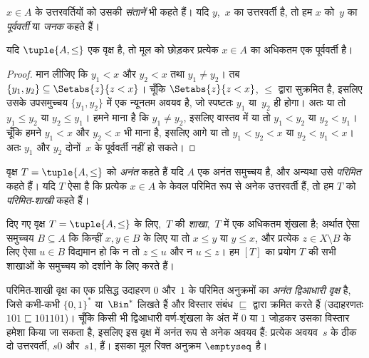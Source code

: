 \documentclass[../../../include/open-logic-section]{subfiles}
\begin{document}
$x \in A$ के उत्तरवर्तियों को उसकी \emph{संतानें} भी कहते हैं। यदि
$y$,~$x$ का उत्तरवर्ती है, तो हम $x$ को~$y$ का \emph{पूर्ववर्ती} या
\emph{जनक} कहते हैं।

\begin{prop}
यदि $\tuple{A,\le}$ एक वृक्ष है, तो मूल को छोड़कर प्रत्येक $x \in A$ का
अधिकतम एक पूर्ववर्ती है।
\end{prop}

\begin{proof}
  मान लीजिए कि $y_1 < x$ और $y_2 < x$ तथा $y_1 \neq y_2$। तब $\{y_1,
  y_2\} \subseteq \Setabs{z}{z<x}$। चूँकि $\Setabs{z}{z<x}$,
  $\le$ द्वारा सुक्रमित है, इसलिए उसके उपसमुच्चय $\{y_1, y_2\}$ में एक
  न्यूनतम अवयव है, जो स्पष्टतः $y_1$ या~$y_2$ ही होगा। अतः या तो
  $y_1 \le y_2$ या $y_2 \le y_1$। हमने माना है कि $y_1 \neq y_2$, इसलिए
  वास्तव में या तो $y_1 < y_2$ या $y_2 < y_1$। चूँकि हमने $y_1 < x$ और
  $y_2 < x$ भी माना है, इसलिए आगे या तो $y_1 < y_2
  < x$ या
  $y_2 < y_1 < x$। अतः $y_1$ और $y_2$ दोनों~$x$ के पूर्ववर्ती नहीं हो
  सकते।
\end{proof}

\begin{defn}
वृक्ष $T = \tuple{A, \le}$ को \emph{अनंत} कहते हैं यदि $A$ एक अनंत
समुच्चय है, और अन्यथा उसे \emph{परिमित} कहते हैं। यदि $T$ ऐसा है कि प्रत्येक
$x \in A$ के केवल परिमित रूप से अनेक उत्तरवर्ती हैं, तो हम $T$ को
\emph{परिमित-शाखी} कहते हैं।
\end{defn}

\begin{defn}[शाखाएँ]
दिए गए वृक्ष $T = \tuple{A, \le}$ के लिए,~$T$ की \emph{शाखा},~$T$ में एक
अधिकतम शृंखला है; अर्थात ऐसा समुच्चय $B \subseteq A$ कि किन्हीं
$x, y \in B$ के लिए या तो $x \le y$ या $y \le x$, और प्रत्येक
$z \in X \setminus B$ के लिए ऐसा $u \in B$ विद्यमान हो कि न तो
$z \le u$ और न $u \le z$।
%
हम $[T]$ का प्रयोग $T$ की सभी शाखाओं के समुच्चय को दर्शाने के लिए करते हैं।
\end{defn}

\begin{ex}
परिमित-शाखी वृक्ष का एक प्रसिद्ध उदाहरण $0$ और~$1$ के परिमित अनुक्रमों का
\emph{अनंत द्विआधारी वृक्ष} है, जिसे कभी-कभी $\{0,1\}^*$ या~$\Bin^*$
लिखते हैं और विस्तार संबंध $\sqsubseteq$ द्वारा क्रमित करते हैं
(उदाहरणतः $101 \sqsubseteq 101101$)। चूँकि किसी भी द्विआधारी वर्ण-शृंखला
के अंत में $0$ या $1$ जोड़कर उसका विस्तार हमेशा किया जा सकता है, इसलिए इस
वृक्ष में अनंत रूप से अनेक अवयव हैं: प्रत्येक अवयव~$s$ के ठीक दो उत्तरवर्ती,
$s0$ और~$s1$, हैं। इसका मूल रिक्त अनुक्रम $\emptyseq$ है।
\end{ex}
\end{document}

